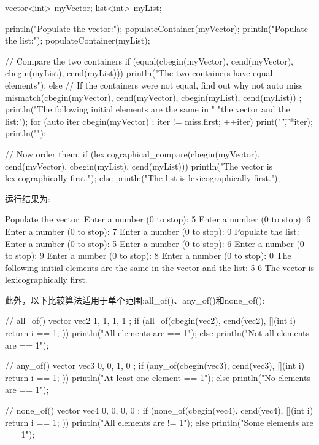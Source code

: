 \begin{cpp}
vector<int> myVector;
list<int> myList;

println("Populate the vector:");
populateContainer(myVector);
println("Populate the list:");
populateContainer(myList);

// Compare the two containers
if (equal(cbegin(myVector), cend(myVector),
          cbegin(myList), cend(myList))) {
    println("The two containers have equal elements");
} else {
    // If the containers were not equal, find out why not
    auto miss { mismatch(cbegin(myVector), cend(myVector),
        cbegin(myList), cend(myList)) };
    println("The following initial elements are the same in "
        "the vector and the list:");
    for (auto iter { cbegin(myVector) }; iter != miss.first; ++iter) {
        print("{}\t", *iter);
    }
    println("");
}

// Now order them.
if (lexicographical_compare(cbegin(myVector), cend(myVector),
cbegin(myList), cend(myList))) {
    println("The vector is lexicographically first.");
} else {
    println("The list is lexicographically first.");
}
\end{cpp}

运行结果为:

\begin{shell}
Populate the vector:
Enter a number (0 to stop): 5
Enter a number (0 to stop): 6
Enter a number (0 to stop): 7
Enter a number (0 to stop): 0
Populate the list:
Enter a number (0 to stop): 5
Enter a number (0 to stop): 6
Enter a number (0 to stop): 9
Enter a number (0 to stop): 8
Enter a number (0 to stop): 0
The following initial elements are the same in the vector and the list:
5 6
The vector is lexicographically first.
\end{shell}

此外，以下比较算法适用于单个范围:all\_of()、any\_of()和none\_of():

\begin{cpp}
// all_of()
vector vec2 { 1, 1, 1, 1 };
if (all_of(cbegin(vec2), cend(vec2), [](int i){ return i == 1; })) {
    println("All elements are == 1");
} else {
    println("Not all elements are == 1");
}

// any_of()
vector vec3 { 0, 0, 1, 0 };
if (any_of(cbegin(vec3), cend(vec3), [](int i){ return i == 1; })) {
    println("At least one element == 1");
} else {
    println("No elements are == 1");
}

// none_of()
vector vec4 { 0, 0, 0, 0 };
if (none_of(cbegin(vec4), cend(vec4), [](int i){ return i == 1; })) {
    println("All elements are != 1");
} else {
    println("Some elements are == 1");
}
\end{cpp}

